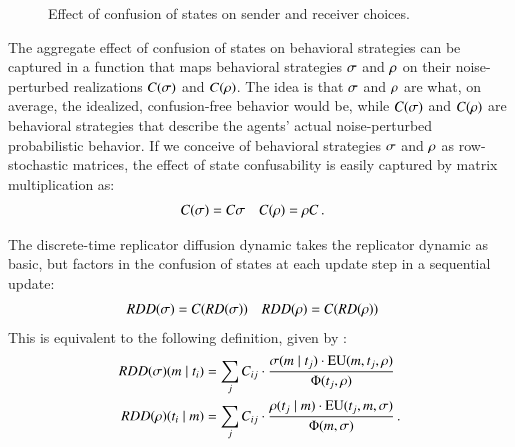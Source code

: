 \begin{figure}

  \caption{Effect of confusion of states on sender and receiver
    choices.}
  \label{fig:noise-perturbation-of-strategies}
\end{figure}

The aggregate effect of confusion of states on behavioral strategies
can be captured in a function that maps behavioral strategies
$\sigma$ and $\rho$ on their noise-perturbed realizations
$C(\sigma)$ and $C(\rho)$. The idea is that $\sigma$ and
$\rho$ are what, on average, the idealized, confusion-free behavior
would be, while $C(\sigma)$ and $C(\rho)$ are behavioral
strategies that describe the agents' actual noise-perturbed
probabilistic behavior. If we conceive of behavioral strategies
$\sigma$ and $\rho$ as row-stochastic matrices, the effect of
state confusability is easily captured by matrix multiplication as:
\begin{align*}
  C(\sigma) & = C \sigma &    C(\rho) & = \rho C\,.
\end{align*}

The discrete-time replicator diffusion dynamic takes the replicator
dynamic as basic, but factors in the confusion of states at each
update step in a sequential update:
\begin{align*}
  RDD(\sigma) & = C(RD(\sigma)) &   RDD(\rho) & = C(RD(\rho)) 
\end{align*}
This is equivalent to the following definition, given by
\citet{Correia2013:The-Bivalent-Tr}:
\begin{align*}
  RDD(\sigma)(m \mid t_i) & = \sum_{j} C_{ij} \cdot
  \frac{\sigma(m \mid t_j) \cdot
    \mathrm{EU}(m,t_j,\rho)} {\Phi(t_j,\rho)} \\
    RDD(\rho)(t_i \mid m) & = \sum_{j} C_{ij} \cdot
  \frac{\rho(t_j \mid m) \cdot
    \mathrm{EU}(t_j,m,\sigma)} {\Phi(m,\sigma)}  \,.
\end{align*}

